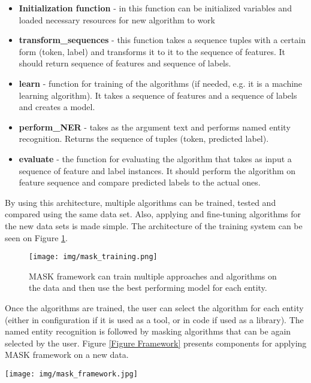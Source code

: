 \documentclass[a4paper,twoside]{article}
\begin{document}
\begin{itemize}
\item \textbf{Initialization function} - in this function can be initialized variables and loaded necessary resources for new algorithm to work
\item \textbf{transform\_sequences} - this function takes a sequence tuples with a certain form (token, label) and transforms it to it to the sequence of features. It should return sequence of features and sequence of labels. 
\item \textbf{learn} - function for training of the algorithms (if needed, e.g. it is a machine learning algorithm). It takes a sequence of features and a sequence of labels and creates a model. 
\item \textbf{perform\_NER} - takes as the argument text and performs named entity recognition. Returns the sequence of tuples (token, predicted label). 
\item \textbf{evaluate} - the function for evaluating the algorithm that takes as input a sequence of feature and label instances. It should perform the algorithm on feature sequence and compare predicted labels to the actual ones. 
\end{itemize}

By using this architecture, multiple algorithms can be trained,  tested and compared using the same data set. Also, applying and fine-tuning algorithms for the new data sets is made simple. The architecture of the training system can be seen on Figure \ref{Figure Training}.

\begin{figure}[h!]
\centering
\texttt{[image: img/mask\_training.png]}
\caption{MASK framework can train multiple approaches and algorithms on the data and then use the best performing model for each entity.}
\label{Figure Training}
\end{figure}

Once the algorithms are trained, the user can select the algorithm for each entity (either in configuration if it is used as a tool, or in code if used as a library). The named entity recognition is followed by masking algorithms that can be again selected by the user. Figure \ref{Figure Framework} presents components for applying MASK framework on a new data. 


\begin{figure*}[ht!]
\centering
\texttt{[image: img/mask\_framework.jpg]}
\caption{MASK framework utilize pre-trained models and perform masking by selected masking algorithm}
\label{Figure Framework}
\end{figure*}
\end{document}
